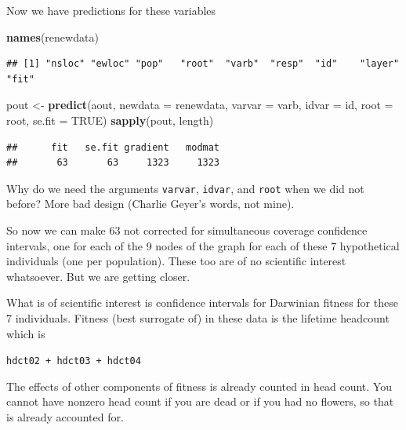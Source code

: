 \documentclass[
  ignorenonframetext,
]{beamer}
\newenvironment{Shaded}{\begin{snugshade}}{\end{snugshade}}
\newcommand{\AttributeTok}[1]{\textcolor[rgb]{0.13,0.29,0.53}{#1}}
\newcommand{\ConstantTok}[1]{\textcolor[rgb]{0.56,0.35,0.01}{#1}}
\newcommand{\FunctionTok}[1]{\textcolor[rgb]{0.13,0.29,0.53}{\textbf{#1}}}
\newcommand{\NormalTok}[1]{#1}
\newcommand{\OtherTok}[1]{\textcolor[rgb]{0.56,0.35,0.01}{#1}}
\begin{document}
\begin{frame}[fragile]{}
\protect\hypertarget{section-32}{}
Now we have predictions for these variables

\vspace{12pt}
\tiny

\begin{Shaded}
\begin{Highlighting}[]
\FunctionTok{names}\NormalTok{(renewdata)}
\end{Highlighting}
\end{Shaded}

\begin{verbatim}
## [1] "nsloc" "ewloc" "pop"   "root"  "varb"  "resp"  "id"    "layer" "fit"
\end{verbatim}

\begin{Shaded}
\begin{Highlighting}[]
\NormalTok{pout }\OtherTok{\textless{}{-}} \FunctionTok{predict}\NormalTok{(aout, }\AttributeTok{newdata =}\NormalTok{ renewdata, }\AttributeTok{varvar =}\NormalTok{ varb, }
  \AttributeTok{idvar =}\NormalTok{ id, }\AttributeTok{root =}\NormalTok{ root, }\AttributeTok{se.fit =} \ConstantTok{TRUE}\NormalTok{)}
\FunctionTok{sapply}\NormalTok{(pout, length)}
\end{Highlighting}
\end{Shaded}

\begin{verbatim}
##      fit   se.fit gradient   modmat 
##       63       63     1323     1323
\end{verbatim}

\vspace{12pt}
\normalsize

Why do we need the arguments \texttt{varvar}, \texttt{idvar}, and
\texttt{root} when we did not before? More bad design (Charlie Geyer's
words, not mine).
\end{frame}

\begin{frame}{}
\protect\hypertarget{section-33}{}
So now we can make 63 not corrected for simultaneous coverage confidence
intervals, one for each of the 9 nodes of the graph for each of these 7
hypothetical individuals (one per population). These too are of no
scientific interest whatsoever. But we are getting closer.

What is of scientific interest is confidence intervals for Darwinian
fitness for these 7 individuals. Fitness (best surrogate of) in these
data is the lifetime headcount which is

\begin{center}
  \texttt{hdct02 + hdct03 + hdct04}
\end{center}

The effects of other components of fitness is already counted in head
count. You cannot have nonzero head count if you are dead or if you had
no flowers, so that is already accounted for.
\end{frame}
\end{document}
